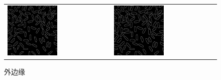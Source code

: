 \documentclass[a4paper]{ctexart}
\begin{document}
  \begin{figure}[H]
    \begin{tabular}{p{}p{}}
    \centering
      \includegraphics*[width=0.5\textwidth]{fig/internal_edge.png}
      \caption{内边缘}
      &
      \centering
      \includegraphics*[width=0.5\textwidth]{fig/external_edge.png}
      \caption{外边缘}
    \end{tabular}


\end{figure}
\end{document}
